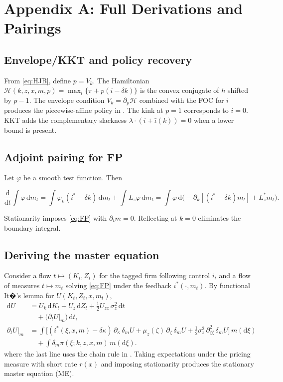 ﻿\documentclass[11pt,letterpaper,oneside]{article}
\numberwithin{equation}{section}
\newcommand{\1}{\mathbf{1}}
\newcommand{\diff}{\mathrm{d}}
\newcommand{\Lz}{L_z}
\newcommand{\Lzadj}{L_z^{\!*}}
\newcommand{\dmU}{\delta_m U}
\newcommand{\kbar}{\bar\iota}
\begin{document}
\appendix
\section{Appendix A: Full Derivations and Pairings}\label{app:derivations}

\subsection{Envelope/KKT and policy recovery}
From \eqref{eq:HJB}, define $p=V_k$. The Hamiltonian
$\mathcal{H}(k,z,x,m,p)=\max_i\{\pi+p(i-\delta k)\}$
is the convex conjugate of $h$ shifted by $p-1$. The envelope condition $V_k=\partial_p \mathcal{H}$ combined with the FOC for $i$ produces the piecewise-affine policy in . The kink at $p=1$ corresponds to $i=0$. KKT adds the complementary slackness $\lambda\cdot(i+\kbar(k))=0$ when a lower bound is present.

\subsection{Adjoint pairing for FP}
Let $\varphi$ be a smooth test function. Then

$$
\frac{\diff}{\diff t}\int \varphi\,\diff m_t
= \int \varphi_k (i^*-\delta k)\,\diff m_t + \int \Lz \varphi\,\diff m_t
= \int \varphi\,\diff\Big(-\partial_k[(i^*-\delta k)m_t]+\Lzadj m_t\Big).
$$

Stationarity imposes \eqref{eq:FP} with $\partial_t m=0$. Reflecting at $k=0$ eliminates the boundary integral.

\subsection{Deriving the master equation}
Consider a flow $t\mapsto (K_t,Z_t)$ for the tagged firm following control $i_t$ and a flow of measures $t\mapsto m_t$ solving \eqref{eq:FP} under the feedback $i^*(\cdot,m_t)$. By functional It�'s lemma for $U(K_t,Z_t,x,m_t)$,
\begin{align*}
\diff U &= U_k\,\diff K_t + U_z\,\diff Z_t + \tfrac12 U_{zz}\,\sigma_z^2\,\diff t \\
        &\quad + \big(\partial_t U\big|_{m}\big)\,\diff t, \\
\partial_t U\big|_{m} &= \int \Big[ (i^*(\xi,x,m)-\delta\kappa)\,\partial_{\kappa}\,\dmU
  +\mu_z(\zeta)\,\partial_{\zeta}\,\dmU
  +\tfrac12\sigma_z^2\,\partial_{\zeta\zeta}^2\,\dmU\Big] \, m(\diff \xi) \\
  &\quad + \int \delta_m \pi(\xi; k,z,x,m) \, m(\diff \xi).
\end{align*}
  where the last line uses the chain rule in . Taking expectations under the pricing measure with short rate $r(x)$ and imposing stationarity produces the stationary master equation (ME).
\end{document}
